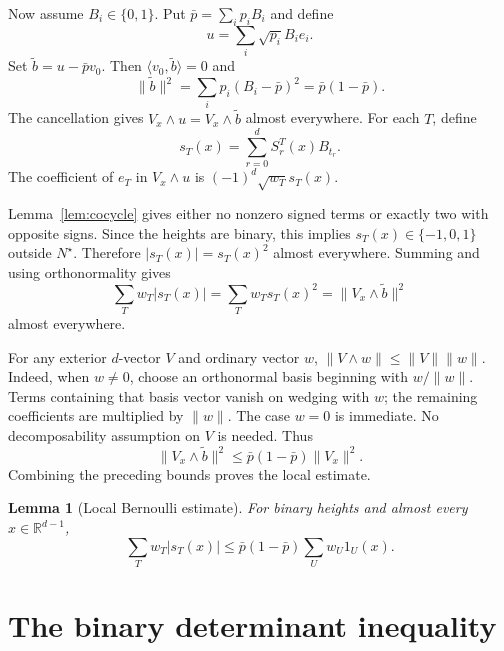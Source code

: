 \documentclass[11pt]{article}
\newtheorem{lemma}[theorem]{Lemma}
\theoremstyle{remark}
\newcommand{\R}{\mathbb{R}}
\newcommand{\one}{1}
\begin{document}
\begin{aiblock}
Now assume $B_i\in\{0,1\}$. Put $\bar p=\sum_i p_iB_i$ and define
\begin{equation}
u=\sum_i\sqrt{p_i}B_ie_i.
\end{equation}
Set $\tilde b=u-\bar p v_0$. Then $\langle v_0,\tilde b\rangle=0$ and
\begin{equation}
\|\tilde b\|^2=\sum_i p_i(B_i-\bar p)^2=\bar p(1-\bar p).
\end{equation}
The cancellation gives $V_x\wedge u=V_x\wedge\tilde b$ almost everywhere.
For each $T$, define
\begin{equation}
s_T(x)=\sum_{r=0}^dS_r^T(x)B_{t_r}.
\end{equation}
The coefficient of $e_T$ in $V_x\wedge u$ is
$(-1)^d\sqrt{w_T}s_T(x)$. 

Lemma~\ref{lem:cocycle} gives either no nonzero signed terms or exactly two with opposite signs. Since the heights are binary, this implies
$s_T(x)\in\{-1,0,1\}$ outside $N^\star$. Therefore
$|s_T(x)|=s_T(x)^2$ almost everywhere. Summing and using orthonormality gives
$$
\sum_Tw_T|s_T(x)|=\sum_Tw_Ts_T(x)^2=\|V_x\wedge\tilde b\|^2
$$
almost everywhere.

For any exterior $d$-vector $V$ and ordinary vector $w$,
$\|V\wedge w\|\leq\|V\|\|w\|$. Indeed, when $w\neq0$, choose an
orthonormal basis beginning with $w/\|w\|$. Terms containing that basis
vector vanish on wedging with $w$; the remaining coefficients are
multiplied by $\|w\|$. The case $w=0$ is immediate. No decomposability
assumption on $V$ is needed. Thus
\begin{equation}
\|V_x\wedge\tilde b\|^2\leq\bar p(1-\bar p)\|V_x\|^2.
\end{equation}
Combining the preceding bounds proves the local estimate.

\begin{lemma}[Local Bernoulli estimate]
\label{lem:local}
For binary heights and almost every $x\in\R^{d-1}$,
\begin{equation}
\sum_Tw_T|s_T(x)|\leq\bar p(1-\bar p)\sum_Uw_U\one_U(x).
\end{equation}
\end{lemma}


\end{aiblock}

\section{The binary determinant inequality}
\label{sec:binary}
\end{document}
